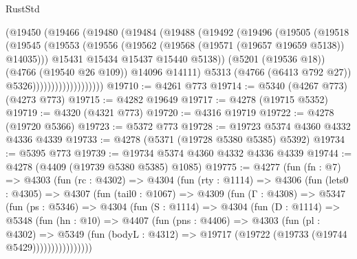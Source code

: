 \begin{lexlean}{RustStd}
\begin{coremodule}
                          (@19450
                            (@19466
                              (@19480
                                (@19484
                                  (@19488
                                    (@19492
                                      (@19496
                                        (@19505
                                          (@19518
                                            (@19545
                                              (@19553
                                                (@19556
                                                  (@19562
                                                    (@19568 (@19571 (@19657 @19659 @5138)) @14035)))
                                                @15431
                                                @15434
                                                @15437
                                                @15440
                                                @5138))
                                            (@5201 (@19536 @18))
                                            (@4766 (@19540 @26 @109))
                                            @14096
                                            @14111)
                                          @5313
                                          (@4766 (@6413 @792 @27))
                                          @5326)))))))))))))))))))
@19710 := @4261 @773
@19714 := @5340 (@4267 @773) (@4273 @773)
@19715 := @4282 @19649
@19717 := @4278 (@19715 @5352)
@19719 := @4320 (@4321 @773)
@19720 := @4316 @19719
@19722 := @4278 (@19720 @5366)
@19723 := @5372 @773
@19728 := @19723 @5374 @4360 @4332 @4336 @4339
@19733 := @4278 (@5371 (@19728 @5380 @5385) @5392)
@19734 := @5395 @773
@19739 := @19734 @5374 @4360 @4332 @4336 @4339
@19744 := @4278 (@4409 (@19739 @5380 @5385) @1085)
@19775 := @4277
    (fun (fn : @7) =>
    @4303
      (fun (rc : @4302) =>
      @4304
        (fun (rty : @1114) =>
        @4306
          (fun (lets0 : @4305) =>
          @4307
            (fun (tail0 : @1067) =>
            @4309
              (fun (Γ : @4308) =>
              @5347
                (fun (ps : @5346) =>
                @4304
                  (fun (S : @1114) =>
                  @4304
                    (fun (D : @1114) =>
                    @5348
                      (fun (hn : @10) =>
                      @4407
                        (fun (pns : @4406) =>
                        @4303
                          (fun (pl : @4302) =>
                          @5349
                            (fun (bodyL : @4312) =>
                            @19717 (@19722 (@19733 (@19744 @5429))))))))))))))))

\end{coremodule}
\end{lexlean}
